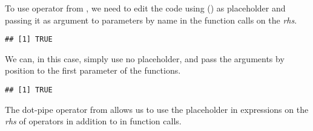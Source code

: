 \documentclass[krantz2]{krantz}\usepackage{knitr}
\begin{document}
\begin{infobox}
To use operator \Roperator{\textbar >} from \Rlang, we need to edit the code using (\code{\_}) as placeholder and passing it as argument to parameters by name in the function calls on the \textit{rhs}.

\begin{knitrout}\footnotesize
{}\color{fgcolor}\begin{kframe}
\begin{alltt}
 \hlstd{(} \hlstd{= _) |>} \hlstd{(} \hlstd{= _)} \hlkwb{->} 
\end{alltt}
\begin{verbatim}
## [1] TRUE
\end{verbatim}
\end{kframe}
\end{knitrout}

We can, in this case, simply use no placeholder, and pass the arguments by position to the first parameter of the functions.

\begin{knitrout}\footnotesize
{}\color{fgcolor}\begin{kframe}
\begin{alltt}
 \hlstd{() |>} \hlstd{()} \hlkwb{->} 
\end{alltt}
\begin{verbatim}
## [1] TRUE
\end{verbatim}
\end{kframe}
\end{knitrout}

\end{infobox}

The  dot-pipe operator  from  allows us to use the placeholder  in expressions on the \emph{rhs} of operators in addition to in function calls.

\begin{knitrout}\footnotesize
{}\color{fgcolor}
\end{knitrout}
\end{document}
